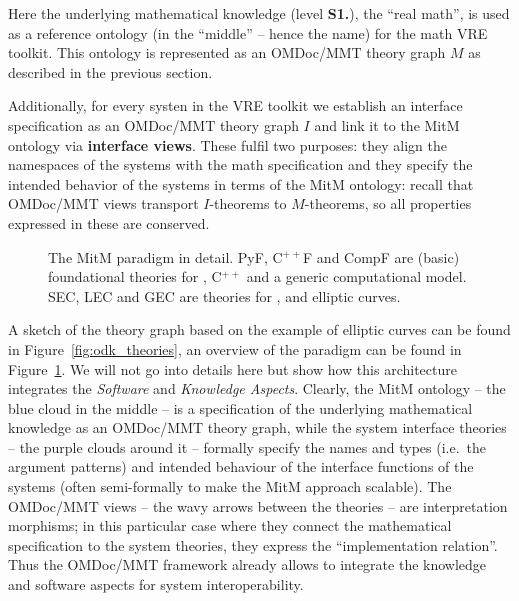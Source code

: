 Here the underlying mathematical knowledge (level \textbf{S1.}), the ``real math'', is
used as a reference ontology (in the ``middle'' -- hence the name) for the math VRE
toolkit. This ontology is represented as an OMDoc/MMT theory graph $M$ as described in the
previous section.

Additionally, for every systen in the \pn VRE toolkit we establish an interface
specification as an OMDoc/MMT theory graph $I$ and link it to the MitM ontology via
\textbf{interface views}. These fulfil two purposes: they align the namespaces of the
systems with the math specification and they specify the intended behavior of the systems
in terms of the MitM ontology: recall that OMDoc/MMT views transport $I$-theorems to
$M$-theorems, so all properties expressed in these are conserved.

\begin{figure}[ht]\centering
  \def\myxscale{3}\def\myyscale{1.2}
  
  \caption{The MitM paradigm in detail. PyF, C${}^{++}$F and CompF are (basic)
    foundational theories for \python, C${}^{++}$ and a generic computational model. SEC,
    LEC and GEC are theories for \SageMath, \LMFDB and \GAP elliptic curves.}\label{fig:mitm}
\end{figure}

A sketch of the theory graph based on the example of elliptic curves can be
found in Figure~\ref{fig:odk_theories}, an overview of the paradigm can be found
in Figure~\ref{fig:mitm}.  We will not go into details here but show how this
architecture integrates the \emph{Software} and \emph{Knowledge Aspects}.
Clearly, the MitM ontology -- the blue cloud in the middle -- is a
specification of the underlying mathematical knowledge as an OMDoc/MMT theory
graph, while the system interface theories -- the purple clouds around it --
formally specify the names and types (i.e.~the argument patterns) and intended
behaviour of the interface functions of the systems (often semi-formally to make
the MitM approach scalable). The OMDoc/MMT views -- the wavy arrows between the
theories -- are interpretation morphisms; in this particular case where they
connect the mathematical specification to the system theories, they express the
``implementation relation''. Thus the OMDoc/MMT framework already allows to
integrate the knowledge and software aspects for system interoperability.

